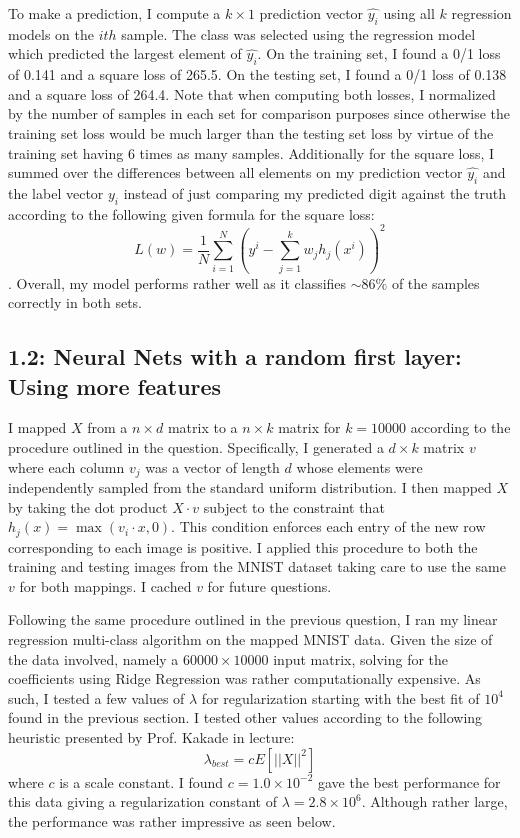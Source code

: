 \documentclass[12pt]{amsart}
\begin{document}
To make a prediction, I compute a $k \times 1$ prediction vector $\hat{y_i}$ using all $k$ regression models on the $ith$ sample.  The class was selected using the regression model which predicted the largest element of $\hat{y_i}$.  On the training set, I found a 0/1 loss of 0.141 and a square loss of 265.5.  On the testing set, I found a 0/1 loss of 0.138 and a square loss of 264.4.  Note that when computing both losses, I normalized by the number of samples in each set for comparison purposes since otherwise the training set loss would be much larger than the testing set loss by virtue of the training set having 6 times as many samples.  Additionally for the square loss, I summed over the differences between all elements on my prediction vector $\hat{y_i}$ and the label vector $y_i$ instead of just comparing my predicted digit against the truth according to the following given formula for the square loss:
\begin{equation} \label{eqn:square_loss}
L(w) = \frac{1}{N} \sum_{i = 1}^N \left(y^i - \sum_{j = 1}^k w_j h_j(x^i)  \right)^2
\end{equation}.  
Overall, my model performs rather well as it classifies ${\sim}86\%$ of the samples correctly in both sets.

\subsection*{1.2: Neural Nets with a random first layer: Using more features}

I mapped $X$ from a $n \times d$ matrix to a $n \times k$ matrix for $k=10000$ according to the procedure outlined in the question.  Specifically, I generated a $d \times k$ matrix $v$ where each column $v_j$ was a vector of length $d$ whose elements were independently sampled from the standard uniform distribution.  I then mapped $X$ by taking the dot product $X \cdot v$ subject to the constraint that $h_j(x) = \max{(v_i \cdot x,0)}$.  This condition enforces each entry of the new row corresponding to each image is positive.  I applied this procedure to both the training and testing images from the MNIST dataset taking care to use the same $v$ for both mappings.  I cached $v$ for future questions.

Following the same procedure outlined in the previous question, I ran my linear regression multi-class algorithm on the mapped MNIST data.  Given the size of the data involved, namely a $60000 \times 10000$ input matrix, solving for the coefficients using Ridge Regression was rather computationally expensive.  As such, I tested a few values of $\lambda$ for regularization starting with the best fit of $10^4$ found in the previous section.  I tested other values according to the following heuristic presented by Prof. Kakade in lecture:
\begin{equation} \label{eqn:lambda_heuristic}
\lambda_{best} = c E[||X||^2]
\end{equation}
where $c$ is a scale constant.  I found $c = 1.0 \times 10^{-2}$ gave the best performance for this data giving a regularization constant of $\lambda = 2.8 \times 10^6$.  Although rather large, the performance was rather impressive as seen below.
 
\end{document}
